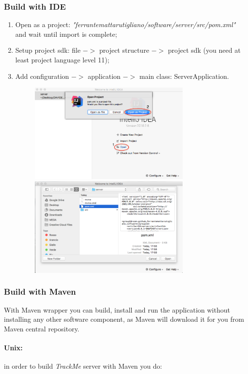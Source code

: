 \documentclass[a4paper]{article}
\begin{document}
\subsubsection{Build with IDE}
\begin{enumerate}
    \item Open as a project: \textit{"ferrantemattarutigliano/software/server/src/pom.xml"} and wait until import is complete;
    \item Setup project sdk: file {$->$} project structure {$->$} project sdk (you need at least project language level 11);
    \item Add configuration {$->$} application {$->$} main class: ServerApplication.
    \begin{figure}[!htpb]
    \centering
    \includegraphics[height=50mm]{ITD/images/intellij_idea1.png}
    \includegraphics[height=50mm]{ITD/images/intellij_idea2.png}
    \end{figure}
\end{enumerate}

\subsubsection{Build with Maven}
With Maven wrapper you can build, install and run the application without installing any other software component, as Maven will download it for you from Maven central repository.

\paragraph{Unix:} in order to build \textit{TrackMe} server with Maven you do:
\end{document}
